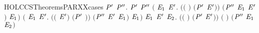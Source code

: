 \newcommand{\HOLCCSTheoremsPARThree}{\UseVerbatim{HOLCCSTheoremsPARThree}}
\begin{SaveVerbatim}{HOLCCSTheoremsPARXXcases}
\HOLTokenTurnstile{} \HOLSymConst{\HOLTokenForall{}} \ensuremath{\HOLBoundVar{P}\sp{\prime{}}}  \ensuremath{\HOLBoundVar{P}\sp{\prime{}\prime{}}}.
      \HOLSymConst{\ensuremath{\mid}} \ensuremath{\HOLBoundVar{P}\sp{\prime{}}} \HOLTokenTransBegin{}\HOLTokenTransEnd \ensuremath{\HOLBoundVar{P}\sp{\prime{}\prime{}}} \HOLSymConst{\HOLTokenImp{}}
     \ensuremath{(}\HOLSymConst{\HOLTokenExists{}} \ensuremath{\HOLBoundVar{E}\sb{\mathrm{1}}} \ensuremath{\HOLBoundVar{E}\sp{\prime{}}}.
        \ensuremath{(}\ensuremath{(} \HOLSymConst{\ensuremath{=}} \ensuremath{)} \HOLSymConst{\HOLTokenConj{}} \ensuremath{(}\ensuremath{\HOLBoundVar{P}\sp{\prime{}}} \HOLSymConst{\ensuremath{=}} \ensuremath{\HOLBoundVar{E}\sp{\prime{}}}\ensuremath{)}\ensuremath{)} \HOLSymConst{\HOLTokenConj{}} \ensuremath{(}\ensuremath{\HOLBoundVar{P}\sp{\prime{}\prime{}}} \HOLSymConst{\ensuremath{=}} \ensuremath{\HOLBoundVar{E}\sb{\mathrm{1}}} \HOLSymConst{\ensuremath{\mid}} \ensuremath{\HOLBoundVar{E}\sp{\prime{}}}\ensuremath{)} \HOLSymConst{\HOLTokenConj{}}  \HOLTokenTransBegin{}\HOLTokenTransEnd \ensuremath{\HOLBoundVar{E}\sb{\mathrm{1}}}\ensuremath{)} \HOLSymConst{\HOLTokenDisj{}}
     \ensuremath{(}\HOLSymConst{\HOLTokenExists{}} \ensuremath{\HOLBoundVar{E}\sb{\mathrm{1}}} \ensuremath{\HOLBoundVar{E}\sp{\prime{}}}.
        \ensuremath{(}\ensuremath{(} \HOLSymConst{\ensuremath{=}} \ensuremath{\HOLBoundVar{E}\sp{\prime{}}}\ensuremath{)} \HOLSymConst{\HOLTokenConj{}} \ensuremath{(}\ensuremath{\HOLBoundVar{P}\sp{\prime{}}} \HOLSymConst{\ensuremath{=}} \ensuremath{)}\ensuremath{)} \HOLSymConst{\HOLTokenConj{}} \ensuremath{(}\ensuremath{\HOLBoundVar{P}\sp{\prime{}\prime{}}} \HOLSymConst{\ensuremath{=}} \ensuremath{\HOLBoundVar{E}\sp{\prime{}}} \HOLSymConst{\ensuremath{\mid}} \ensuremath{\HOLBoundVar{E}\sb{\mathrm{1}}}\ensuremath{)} \HOLSymConst{\HOLTokenConj{}}  \HOLTokenTransBegin{}\HOLTokenTransEnd \ensuremath{\HOLBoundVar{E}\sb{\mathrm{1}}}\ensuremath{)} \HOLSymConst{\HOLTokenDisj{}}
     \HOLSymConst{\HOLTokenExists{}}  \ensuremath{\HOLBoundVar{E}\sb{\mathrm{1}}} \ensuremath{\HOLBoundVar{E}\sp{\prime{}}} \ensuremath{\HOLBoundVar{E}\sb{\mathrm{2}}}.
       \ensuremath{(}\ensuremath{(} \HOLSymConst{\ensuremath{=}} \ensuremath{)} \HOLSymConst{\HOLTokenConj{}} \ensuremath{(}\ensuremath{\HOLBoundVar{P}\sp{\prime{}}} \HOLSymConst{\ensuremath{=}} \ensuremath{\HOLBoundVar{E}\sp{\prime{}}}\ensuremath{)}\ensuremath{)} \HOLSymConst{\HOLTokenConj{}} \ensuremath{(} \HOLSymConst{\ensuremath{=}} \HOLConst{\ensuremath{\tau}}\ensuremath{)} \HOLSymConst{\HOLTokenConj{}} \ensuremath{(}\ensuremath{\HOLBoundVar{P}\sp{\prime{}\prime{}}} \HOLSymConst{\ensuremath{=}} \ensuremath{\HOLBoundVar{E}\sb{\mathrm{1}}} \HOLSymConst{\ensuremath{\mid}} \ensuremath{\HOLBoundVar{E}\sb{\mathrm{2}}}\ensuremath{)} \HOLSymConst{\HOLTokenConj{}}

\end{SaveVerbatim}

